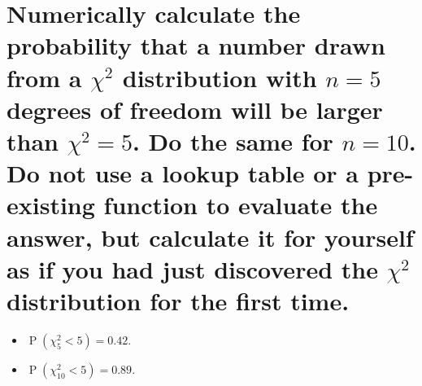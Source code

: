
    \section{Numerically calculate the probability that a number drawn
    from a \texorpdfstring{$\chi^2$}{chi-squared} distribution with 
    \texorpdfstring{$n=5$}{n=5} degrees of freedom will be larger
    than \texorpdfstring{$\chi^2=5$}{chi-squared=5}.
    Do the same for \texorpdfstring{$n=10$}{n=10}.
    Do not use a lookup table or a pre-existing function to evaluate the
    answer, but calculate it for yourself as if you had just discovered the
    \texorpdfstring{$\chi^2$}{chi-squared}
    distribution for the first time.}

    \begin{itemize}
        \item $\operatorname{P}(\chi^2_{5} < 5) = 0.42$.

        \item $\operatorname{P}(\chi^2_{10} < 5) = 0.89$.
    \end{itemize}
    